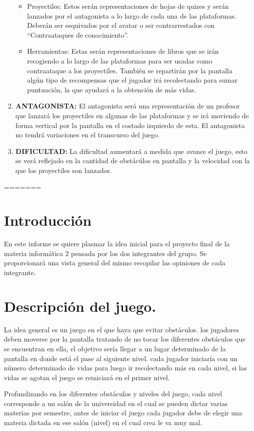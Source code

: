 \documentclass{article}
\begin{document}
\begin{enumerate}
\begin{itemize}
        \item Proyectiles: Estos serán representaciones de hojas de quizes y serán lanzados por el antagonista a lo largo de cada una de las plataformas. Deberán ser esquivados por el avatar o ser contrarrestados con “Contraataques de conocimiento”.
        \item Herramientas: Estas serán representaciones de libros que se irán recogiendo a lo largo de las plataformas para ser usadas como contraataque a los proyectiles. También se repartirán por la pantalla algún tipo de recompensas que el jugador irá recolectando para sumar puntuación, la que ayudará a la obtención de más vidas.
    \end{itemize}
  \item \textbf{ANTAGONISTA:} El antagonista será una representación de un profesor que lanzará los proyectiles en algunas de las plataformas y se irá moviendo de forma vertical por la pantalla en el costado izquierdo de esta. El antagonista no tendrá variaciones en el transcurso del juego.
  \item \textbf{DIFICULTAD:} La dificultad aumentará a medida que avance el juego, esto se verá reflejado en la cantidad de obstácúlos en pantalla y la velocidad con la que los proyectiles son lanzados.
\end{enumerate}
=======
\section{Introducción}\label{intro}
En este informe se quiere plasmar la idea inicial para el proyecto final de la materia informática 2 pensada por los dos integrantes del grupo. Se proporcionará una vista general del mismo recopilar las opiniones de cada integrante.

\section{Descripción del juego.} \label{contenido}

  La idea general es un juego en el que haya que evitar obstáculos. los jugadores deben moverse por la pantalla tratando de no tocar los diferentes obstáculos que se encuentran en ella, el objetivo sería llegar a un lugar determinado de la pantalla en donde está el pase al siguiente nivel. cada jugador iniciaría con un número determinado de vidas para luego ir recolectando más en cada nivel, si las vidas se agotan el juego se reiniciará en el primer nivel.

Profundizando en los diferentes obstáculos y niveles del juego,
cada nivel corresponde a un salón de la universidad en el cual se pueden dictar varias materias por semestre, antes de iniciar el juego cada jugador debe de elegir una materia dictada en ese salón (nivel) en el cual crea le va muy mal.
\end{document}
